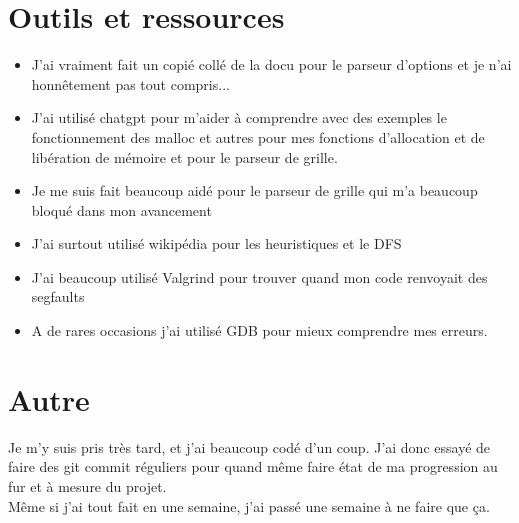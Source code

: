 \documentclass{article}
\begin{document}
\newpage
\section{Outils et ressources}

\begin{itemize}
    \item J'ai vraiment fait un copié collé de la docu pour le parseur d'options et je n'ai honnêtement pas tout compris...\\
    \item J'ai utilisé chatgpt pour m'aider à comprendre avec des exemples le fonctionnement des malloc et autres pour mes fonctions d'allocation et de libération de mémoire et pour le parseur de grille.\\
    \item Je me suis fait beaucoup aidé pour le parseur de grille qui m'a beaucoup bloqué dans mon avancement\\
    \item J'ai surtout utilisé wikipédia pour les heuristiques et le DFS\\
    \item J'ai beaucoup utilisé Valgrind pour trouver quand mon code renvoyait des segfaults\\
    \item A de rares occasions j'ai utilisé GDB pour mieux comprendre mes erreurs.
\end{itemize}
\newpage
\section{Autre}

Je m'y suis pris très tard, et j'ai beaucoup codé d'un coup. J'ai donc essayé de faire des git commit réguliers pour quand même faire état de ma progression au fur et à mesure du projet. \\

Même si j'ai tout fait en une semaine, j'ai passé une semaine à ne faire que ça.
\end{document}
